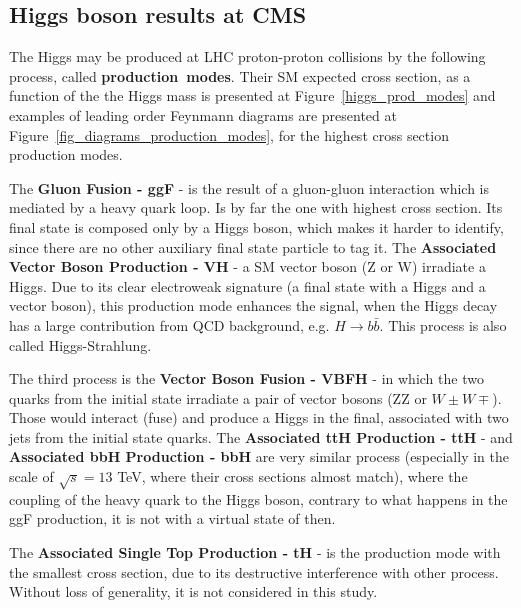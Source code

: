 \subsection{Higgs boson results at CMS}
\label{section_sm_vb_results}

The Higgs may be produced at LHC proton-proton collisions by the following process, called \mbox{\textbf{production modes}}. Their SM expected cross section, as a function of the the Higgs mass is presented at Figure~\ref{higgs_prod_modes} and examples of leading order Feynmann diagrams are presented at Figure~\ref{fig_diagrams_production_modes}, for the highest cross section production modes.

The \textbf{Gluon Fusion - ggF} - is the result of a gluon-gluon interaction which is mediated by a heavy quark loop. Is by far the one with highest cross section. Its final state is composed only by a Higgs boson, which makes it harder to identify, since there are no other auxiliary final state particle to tag it. The \textbf{Associated Vector Boson Production - VH} - a SM vector boson (Z or W) irradiate a Higgs. Due to its clear electroweak signature (a final state with a Higgs and a vector boson), this production mode enhances the signal, when the Higgs decay has a large contribution from QCD background, e.g. $H \rightarrow b\bar{b}$. This process is also called Higgs-Strahlung.

The third process is the \textbf{Vector Boson Fusion - VBFH} - in which the two quarks from the initial state irradiate a pair of vector bosons (ZZ or $W{\pm}W{\mp}$). Those would interact (fuse) and produce a Higgs in the final, associated with two jets from the initial state quarks. The \textbf{Associated ttH Production - ttH} - and 
\textbf{Associated bbH Production - bbH} are very similar process (especially in the scale of $\sqrt{s} = 13$ TeV, where their cross sections almost match), where the coupling of the heavy quark to the Higgs boson, contrary to what happens in the ggF production, it is not with a virtual state of then. 

The \textbf{Associated Single Top Production - tH} - is the production mode with the smallest cross section, due to its destructive interference with other process. Without loss of generality, it is not considered in this study.


